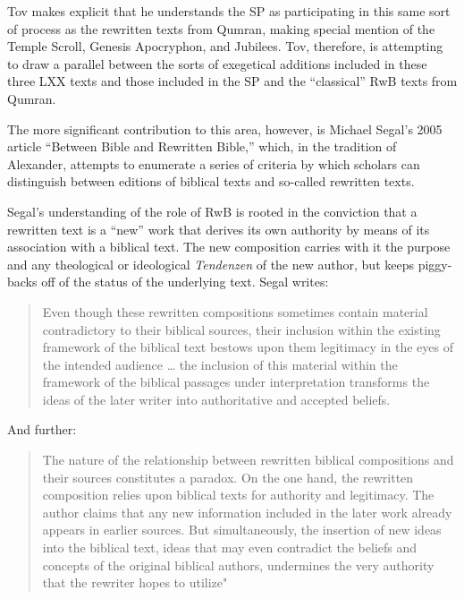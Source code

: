 Tov makes explicit that he understands the SP as participating in this
same sort of process as the rewritten texts from Qumran, making special
mention of the Temple Scroll, Genesis Apocryphon, and Jubilees. Tov,
therefore, is attempting to draw a parallel between the sorts of
exegetical additions included in these three LXX texts and those
included in the SP and the ``classical'' RwB texts from Qumran.

The more significant contribution to this area, however, is Michael
Segal's 2005 article ``Between Bible and Rewritten Bible,'' which, in
the tradition of Alexander, attempts to enumerate a series of criteria
by which scholars can distinguish between editions of biblical texts and
so-called rewritten texts.

Segal's understanding of the role of RwB is rooted in the conviction
that a rewritten text is a ``new'' work that derives its own authority
by means of its association with a biblical text. The new composition
carries with it the purpose and any theological or ideological
\emph{Tendenzen} of the new author, but keeps piggy-backs off of the
status of the underlying text.\autocite[11]{segal_henze2005} Segal
writes:

\begin{quote}
Even though these rewritten compositions sometimes contain material
contradictory to their biblical sources, their inclusion within the
existing framework of the biblical text bestows upon them legitimacy in
the eyes of the intended audience \ldots{} the inclusion of this
material within the framework of the biblical passages under
interpretation transforms the ideas of the later writer into
authoritative and accepted beliefs.\autocite[11]{segal_henze2005}
\end{quote}

And further:

\begin{quote}
The nature of the relationship between rewritten biblical compositions
and their sources constitutes a paradox. On the one hand, the rewritten
composition relies upon biblical texts for authority and legitimacy. The
author claims that any new information included in the later work
already appears in earlier sources. But simultaneously, the insertion of
new ideas into the biblical text, ideas that may even contradict the
beliefs and concepts of the original biblical authors, undermines the
very authority that the rewriter hopes to
utilize"\autocite[11-12]{segal_henze2005}
\end{quote}


